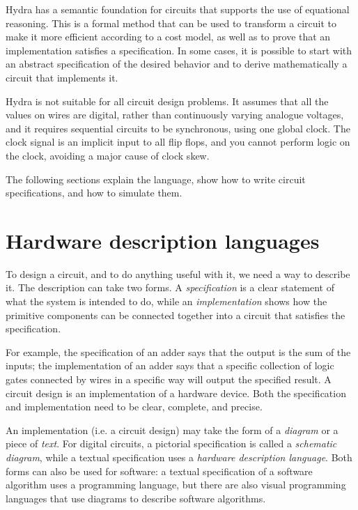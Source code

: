\documentclass[]{svmono}
\begin{document}
Hydra has a semantic foundation for circuits that supports the use
of equational reasoning.  This is a formal method that can be used
to transform a circuit to make it more efficient according to a
cost model, as well as to prove that an implementation satisfies a
specification.  In some cases, it is possible to start with an
abstract specification of the desired behavior and to derive
mathematically a circuit that implements it.

Hydra is not suitable for all circuit design problems.  It assumes
that all the values on wires are digital, rather than continuously
varying analogue voltages, and it requires sequential circuits to
be synchronous, using one global clock.  The clock signal is an
implicit input to all flip flops, and you cannot perform logic on
the clock, avoiding a major cause of clock skew.

The following sections explain the language, show how to write
circuit specifications, and how to simulate them.
\section*{Hardware description languages}
\label{sec:org3f6a8f7}

To design a circuit, and to do anything useful with it, we need a
way to describe it.  The description can take two forms.  A
\emph{specification} is a clear statement of what the system is
intended to do, while an \emph{implementation} shows how the primitive
components can be connected together into a circuit that satisfies
the specification.

For example, the specification of an adder says that the output is
the sum of the inputs; the implementation of an adder says that a
specific collection of logic gates connected by wires in a
specific way will output the specified result.  A circuit design
is an implementation of a hardware device.  Both the specification
and implementation need to be clear, complete, and precise.

An implementation (i.e. a circuit design) may take the form of a
\emph{diagram} or a piece of \emph{text}.  For digital circuits, a pictorial
specification is called a \emph{schematic diagram}, while a textual
specification uses a \emph{hardware description language}.  Both forms
can also be used for software: a textual specification of a
software algorithm uses a programming language, but there are also
visual programming languages that use diagrams to describe
software algorithms.
\end{document}
